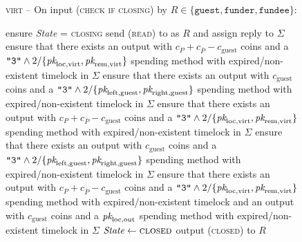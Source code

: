 \begin{figure}[H]
  \begin{processbox}{\textsc{virt} -- On input (\textsc{check if closing}) by
  $R \in \{\texttt{guest}, \texttt{funder}, \texttt{fundee}\}$:}
    \begin{algorithmic}[1]
      \State ensure \textit{State} = \textsc{closing}
      \State send (\textsc{read}) to \ledger as $R$ and assign reply to $\Sigma$
        \State ensure that there exists an output with $c_P + c_{\bar{P}} -
        c_{\mathrm{guest}}$ coins and a $\texttt{"3"} \wedge
        2/\{\textit{pk}_{\mathrm{loc}, \mathrm{virt}}, \textit{pk}_{\mathrm{rem},
        \mathrm{virt}}\}$ spending method with expired/non-existent timelock in
        $\Sigma$ 
        \label{code:virtual-layer:check-chain-close:funder:output-guest}
        \State ensure that there exists an output with $c_{\mathrm{guest}}$
        coins and a $\texttt{"3"} \wedge 2/\{\textit{pk}_{\mathrm{left}, \mathrm{guest}},
        \textit{pk}_{\mathrm{right}, \mathrm{guest}}\}$ spending method with
        expired/non-existent timelock in $\Sigma$ 
        \label{code:virtual-layer:check-chain-close:funder:output-funder}
        \State ensure that there exists an output with $c_P + c_{\bar{P}} -
        c_{\mathrm{guest}}$ coins and a $\texttt{"3"} \wedge
        2/\{\textit{pk}_{\mathrm{loc}, \mathrm{virt}}, \textit{pk}_{\mathrm{rem},
        \mathrm{virt}}\}$ spending method with expired/non-existent timelock in
        $\Sigma$ 
        \State ensure that there exists an output with $c_{\mathrm{guest}}$
        coins and a $\texttt{"3"} \wedge 2/\{\textit{pk}_{\mathrm{left}, \mathrm{guest}},
        \textit{pk}_{\mathrm{right}, \mathrm{guest}}\}$ spending method with
        expired/non-existent timelock in $\Sigma$ 
      \Else \: 
        \State ensure that there exists an output with $c_P + c_{\bar{P}} -
        c_{\mathrm{guest}}$ coins and a $\texttt{"3"} \wedge
        2/\{\textit{pk}_{\mathrm{loc}, \mathrm{virt}}, \textit{pk}_{\mathrm{rem},
        \mathrm{virt}}\}$ spending method with expired/non-existent timelock and
        an output with $c_{\mathrm{guest}}$ coins and a $\textit{pk}_{\mathrm{loc},
        \mathrm{out}}$ spending method with expired/non-existent timelock in
        $\Sigma$
      \EndIf
      \State $\textit{State} \gets \textsc{closed}$
      \State output (\textsc{closed}) to $R$
    \end{algorithmic}
  \end{processbox}
  \caption{}
  \label{code:virtual-layer:check-chain-close}
\end{figure}


